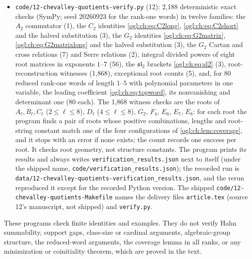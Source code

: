 \documentclass[11pt,oneside]{article}
\numberwithin{equation}{section}
\theoremstyle{definition}
\theoremstyle{remark}
\newcommand{\fn}[1]{\nolinkurl{#1}}
\begin{document}
\begin{itemize}[leftmargin=*]
each, the identity
$(X^{2e_1}-X^{e_1})\sum_{r=0}^MX^{e_0-(r+2)e_1}=X^{e_0}-X^{e_0-(M+1)e_1}$), and the
Whitehead diagonal identity over rational units (5). It prints its results and
always overwrites \fn{verification_results.json} next to itself (under the shipped
name, \fn{code/verification_results.json}); the recorded run is
\fn{data/11-matrix-shadows-verification_results.json}, and the rerun reproduced
its content exactly.
\item \fn{code/12-chevalley-quotients-verify.py} (12): 2,188 deterministic exact
checks (SymPy; seed 20260923 for the rank-one words) in twelve families: the
$A_2$ commutator (1), the $C_2$ identities \eqref{ogl:ch:eq:C2long},
\eqref{ogl:ch:eq:C2short} and the halved substitution (3), the $G_2$ identities
\eqref{ogl:ch:eq:G2matrix}, \eqref{ogl:ch:eq:G2matrixlong} and the halved
substitution (3), the $G_2$ Cartan and cross relations (7) and Serre relations
(2), integral divided powers of eight root matrices in exponents $1$--$7$ (56),
the $\mathfrak{sl}_2$ brackets \eqref{ogl:ch:eq:sl2} (3), root-reconstruction
witnesses (1,868), exceptional root counts (5), and, for 80 reduced rank-one
words of length $1$--$5$ with polynomial parameters in one variable, the leading
coefficient \eqref{ogl:ch:eq:topword}, its nonvanishing and determinant one (80
each). The 1,868 witness checks are the roots of $A_\ell,B_\ell,C_\ell$
($2\le\ell\le8$), $D_\ell$ ($4\le\ell\le8$), $G_2$, $F_4$, $E_6$, $E_7$, $E_8$: for
each root the program finds a pair of roots whose positive combinations, lengths
and root-string constant match one of the four configurations of
\cref{ogl:ch:lem:coverage}, and it stops with an error if none exists; the count
records one success per root. It checks root geometry, not structure constants.
The program prints its results and always writes \fn{verification_results.json}
next to itself (under the shipped name, \fn{code/verification_results.json});
the recorded run is \fn{data/12-chevalley-quotients-verification_results.json},
and the rerun reproduced it except for the recorded Python version. The shipped
\fn{code/12-chevalley-quotients-Makefile} names the delivery files
\fn{article.tex} (source 12's manuscript, not shipped) and \fn{verify.py}.
\end{itemize}
These programs check finite identities and examples. They do not verify Hahn
summability, support gaps, class-size or cardinal arguments, algebraic-group
structure, the reduced-word arguments, the coverage lemma in all ranks, or any
minimization or coinitiality theorem, which are proved in the text.
\end{document}
